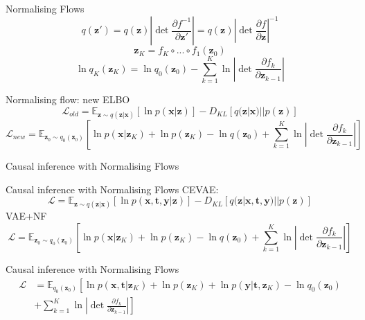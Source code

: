 \documentclass{beamer}
\newcommand{\E}{\mathbb{E}}
\newcommand{\bt}{\mathbf{t}}
\newcommand{\bx}{\mathbf{x}}
\newcommand{\by}{\mathbf{y}}
\newcommand{\bz}{\mathbf{z}}
\newcommand{\parfrac}[2]{\frac{\partial #1}{\partial#2}}
\begin{document}
	\begin{frame}{Normalising Flows}
	    $$q(\bz') = q(\bz)\left| \det \parfrac{f^{-1}}{\bz'} \right| = q(\bz)\left| \det \parfrac{f}{\bz} \right| ^{-1}$$
	    $$\bz_K = f_K  \circ ... \circ f_1(\bz_0)$$
	    $$\ln q_K(\bz_K) = \ln q_0(\bz_0) - \sum\limits^K_{k=1} \ln \left|\det \parfrac{f_k}{\bz_{k-1}} \right| $$ 
	\end{frame}
	
	\begin{frame}{Normalising flow: new ELBO}
	     $$\mathcal{L}_{old} = \E_{\bz \sim q(\bz|\bx)}[\ln p(\bx|\bz)] - D_{KL}[q(\bz|\bx) || p(\bz)]$$
	     $$\mathcal{L}_{new} = \E_{\bz_0 \sim q_0(\bz_0)}[\ln p(\bx| \bz_K) + \ln p(\bz_K) - \ln q(\bz_0) + \sum\limits^K_{k=1}\ln \left|\det \parfrac{f_k}{\bz_{k-1}} \right|]  $$
	\end{frame}
	\begin{frame}{Causal inference with Normalising Flows}
	    \centering
	\end{frame}
	
	\begin{frame}{Causal inference with Normalising Flows}
	    CEVAE:
	    $$ \mathcal{L} = \E_{\bz \sim q(\bz|\bx)}[\ln p(\bx, \bt, \by|\bz)] - D_{KL}[q(\bz|\bx, \bt, \by) || p(\bz)]$$
	    VAE+NF
	    $$\mathcal{L} = \E_{\bz_0 \sim q_0(\bz_0)}[\ln p(\bx| \bz_K) + \ln p(\bz_K) - \ln q(\bz_0) + \sum\limits^K_{k=1}\ln \left|\det \parfrac{f_k}{\bz_{k-1}} \right|]  $$
	\end{frame}
	
	\begin{frame}{Causal inference with Normalising Flows}
	    \begin{equation}\begin{split}
	    \mathcal{L} &= \mathbb{E}_{q_0(\bz_0)}\left[\ln p(\bx, \bt | \bz_K) + \ln p(\bz_K) + \ln p(\by |\bt, \bz_K) - \ln q_0(\bz_0)\right.\\
	    &\left. + \sum\limits^K_{k=1} \ln \left| \det \parfrac{f_k}{\bz_{k-1}}\right| \right]
	    \end{split}\end{equation}
	\end{frame}
\end{document}
